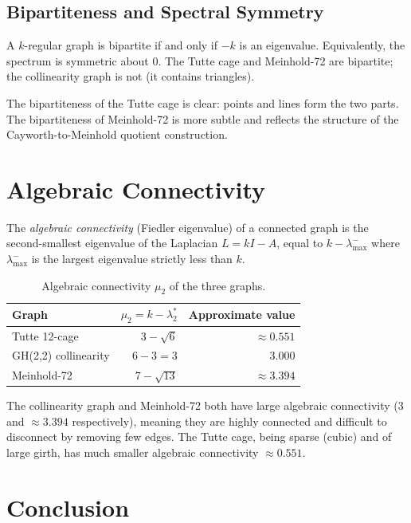 \documentclass[11pt,a4paper]{article}
\theoremstyle{plain}
\theoremstyle{definition}
\theoremstyle{remark}
\begin{document}
\subsection{Bipartiteness and Spectral Symmetry}

A $k$-regular graph is bipartite if and only if $-k$ is an eigenvalue.  Equivalently,
the spectrum is symmetric about 0.  The Tutte cage and Meinhold-72 are bipartite; the
collinearity graph is not (it contains triangles).

The bipartiteness of the Tutte cage is clear: points and lines form the two parts.
The bipartiteness of Meinhold-72 is more subtle and reflects the structure of the
Cayworth-to-Meinhold quotient construction.

\section{Algebraic Connectivity}

The \emph{algebraic connectivity} (Fiedler eigenvalue) of a connected graph is the
second-smallest eigenvalue of the Laplacian $L = kI - A$, equal to $k - \lambda_{\max}^-$
where $\lambda_{\max}^-$ is the largest eigenvalue strictly less than $k$.

\begin{table}[h]
\centering
\caption{Algebraic connectivity $\mu_2$ of the three graphs.}
\label{tab:fiedler}
\begin{tabular}{@{}lrr@{}}
\toprule
Graph & $\mu_2 = k - \lambda_2^*$ & Approximate value \\
\midrule
Tutte 12-cage        & $3 - \sqrt{6}$  & $\approx 0.551$ \\
GH(2,2) collinearity & $6 - 3 = 3$     & $3.000$ \\
Meinhold-72          & $7 - \sqrt{13}$ & $\approx 3.394$ \\
\bottomrule
\end{tabular}
\end{table}

The collinearity graph and Meinhold-72 both have large algebraic connectivity (3 and
$\approx 3.394$ respectively), meaning they are highly connected and difficult to
disconnect by removing few edges.  The Tutte cage, being sparse (cubic) and of large
girth, has much smaller algebraic connectivity $\approx 0.551$.

\section{Conclusion}
\end{document}
